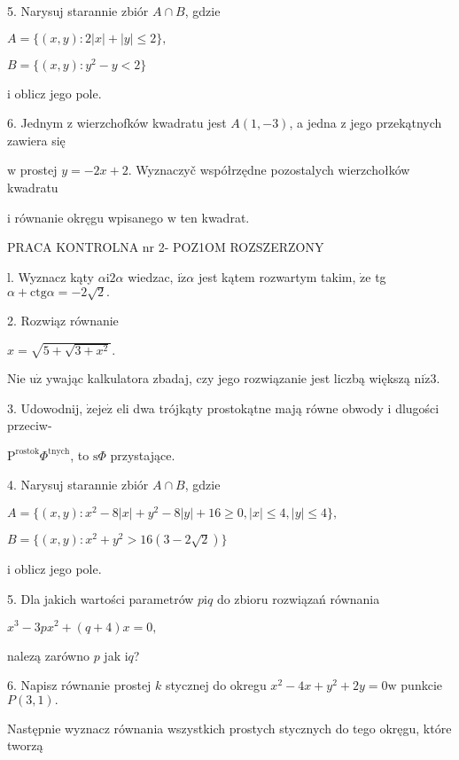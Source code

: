 \documentclass[a4paper,12pt]{article}
\begin{document}
5. Narysuj starannie zbiór $A\cap B$, gdzie

$A=\{(x,y):2|x|+|y|\leq 2\},$

$B=\{(x,y):y^{2}-y<2\}$

$\mathrm{i}$ oblicz jego pole.

6. Jednym $\mathrm{z}$ wierzchofków kwadratu jest $A(1,-3)$, a jedna $\mathrm{z}$ jego przekątnych zawiera się

$\mathrm{w}$ prostej $y = -2x+2$. Wyznaczyč współrzędne pozostalych wierzchołków kwadratu

$\mathrm{i}$ równanie okręgu wpisanego $\mathrm{w}$ ten kwadrat.




PRACA KONTROLNA nr 2- POZ1OM ROZSZERZONY

l. Wyznacz kąty $\alpha \mathrm{i}2\alpha$ wiedzac, $\mathrm{i}\dot{\mathrm{z}}\alpha$ jest kątem rozwartym takim, $\dot{\mathrm{z}}\mathrm{e}$ tg $\alpha+\mathrm{c}\mathrm{t}\mathrm{g}\alpha=-2\sqrt{2}.$

2. Rozwiąz równanie

$x=\sqrt{5+\sqrt{3+x^{2}}}.$

Nie $\mathrm{u}\dot{\mathrm{z}}$ ywając kalkulatora zbadaj, czy jego rozwiązanie jest liczbą większą $\mathrm{n}\mathrm{i}\dot{\mathrm{z}}3.$

3. Udowodnij, $\dot{\mathrm{z}}\mathrm{e}\mathrm{j}\mathrm{e}\dot{\mathrm{z}}$ eli dwa trójkąty prostokątne mają równe obwody $\mathrm{i}$ dlugości przeciw-

$\mathrm{P}^{\mathrm{r}\mathrm{o}\mathrm{s}\mathrm{t}\mathrm{o}\mathrm{k}}\Phi^{\mathrm{t}\mathrm{n}\mathrm{y}\mathrm{c}\mathrm{h}}$, to $\mathrm{s}\Phi$ przystające.

4. Narysuj starannie zbiór $A\cap B$, gdzie

$A=\{(x,y):x^{2}-8|x|+y^{2}-8|y|+16\geq 0,|x|\leq 4,|y|\leq 4\},$

$B=\{(x,y):x^{2}+y^{2}>16(3-2\sqrt{2})\}$

$\mathrm{i}$ oblicz jego pole.

5. Dla jakich wartości parametrów $p\mathrm{i}q$ do zbioru rozwiązań równania

$x^{3}-3px^{2}+(q+4)x=0,$

nalezą zarówno $p$ jak $\mathrm{i}q$?

6. Napisz równanie prostej $k$ stycznej do okregu $x^{2}-4x+y^{2}+2y=0\mathrm{w}$ punkcie $P(3,1).$

Następnie wyznacz równania wszystkich prostych stycznych do tego okręgu, które tworzą
\end{document}
